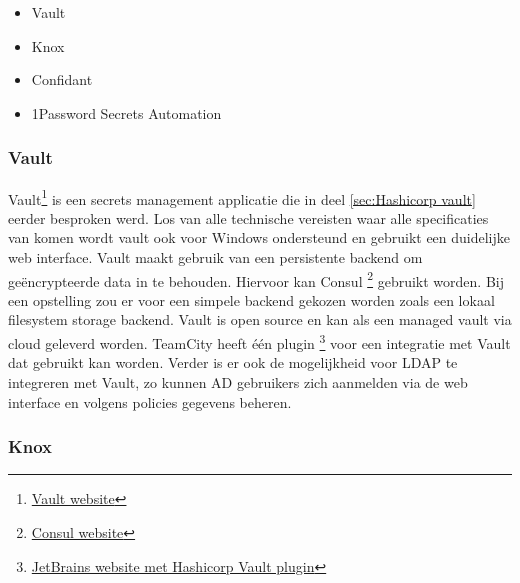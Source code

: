 \begin{itemize}
    \item Vault
    \item Knox
    \item Confidant
    \item 1Password Secrets Automation
\end{itemize}

\subsubsection{Vault}

Vault\footnote{\href{https://www.vaultproject.io/}{Vault website}} is een secrets management applicatie die in deel \ref{sec:Hashicorp vault} eerder besproken werd. Los van alle technische vereisten waar alle specificaties van komen wordt vault ook voor Windows ondersteund en gebruikt een duidelijke web interface. Vault maakt gebruik van een persistente backend om geëncrypteerde data in te behouden. Hiervoor kan Consul \footnote{\href{https://www.consul.io/}{Consul website}} gebruikt worden. Bij een opstelling zou er voor een simpele backend gekozen worden zoals een lokaal filesystem storage backend. Vault is open source en kan als een managed vault via cloud geleverd worden. TeamCity heeft één plugin \footnote{\href{https://plugins.jetbrains.com/plugin/10011-hashicorp-vault-support}{JetBrains website met Hashicorp Vault plugin}} voor een integratie met Vault dat gebruikt kan worden. Verder is er ook de mogelijkheid voor LDAP te integreren met Vault, zo kunnen AD gebruikers zich aanmelden via de web interface en volgens policies gegevens beheren. 

\subsubsection{Knox}


